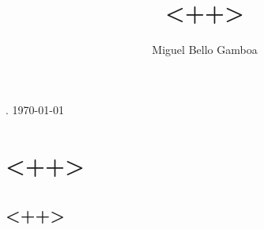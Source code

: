 \documentclass[a4paper, 11pt]{article}
\renewcommand*{\maketitle}{
  {\begin{center}\LARGE\bf\sffamily \thetitle \end{center}}
  {\begin{center}\large \theauthor. \today \end{center}\bigskip}
}
\begin{document}
\title{<++>}
\author{Miguel Bello Gamboa}
\maketitle
\setlength{\parindent}{0pt}
\setlength{\parskip}{1em plus 0.3em minus 0.2em}

\section{<++>}
\subsection{<++>}


 
 
\end{document}
